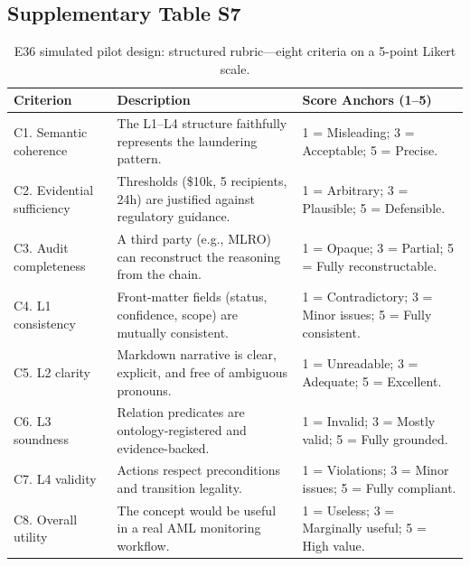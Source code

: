 \subsection{Supplementary Table S7}\label{tab:S7}
\begin{table}[htbp]
\centering
\footnotesize
\caption{E36 simulated pilot design: structured rubric---eight criteria on a 5-point Likert scale.}
\label{tab:e36-rubric}
\begin{tabular}{@{}p{2.5cm}p{5.5cm}p{5.5cm}@{}}
\toprule
\textbf{Criterion} & \textbf{Description} & \textbf{Score Anchors (1--5)} \\
\midrule
C1. Semantic coherence & The L1--L4 structure faithfully represents the laundering pattern. & 1 = Misleading; 3 = Acceptable; 5 = Precise. \\
C2. Evidential sufficiency & Thresholds (\$10k, 5 recipients, 24h) are justified against regulatory guidance. & 1 = Arbitrary; 3 = Plausible; 5 = Defensible. \\
C3. Audit completeness & A third party (e.g., MLRO) can reconstruct the reasoning from the chain. & 1 = Opaque; 3 = Partial; 5 = Fully reconstructable. \\
C4. L1 consistency & Front-matter fields (status, confidence, scope) are mutually consistent. & 1 = Contradictory; 3 = Minor issues; 5 = Fully consistent. \\
C5. L2 clarity & Markdown narrative is clear, explicit, and free of ambiguous pronouns. & 1 = Unreadable; 3 = Adequate; 5 = Excellent. \\
C6. L3 soundness & Relation predicates are ontology-registered and evidence-backed. & 1 = Invalid; 3 = Mostly valid; 5 = Fully grounded. \\
C7. L4 validity & Actions respect preconditions and transition legality. & 1 = Violations; 3 = Minor issues; 5 = Fully compliant. \\
C8. Overall utility & The concept would be useful in a real AML monitoring workflow. & 1 = Useless; 3 = Marginally useful; 5 = High value. \\
\bottomrule
\end{tabular}
\end{table}

